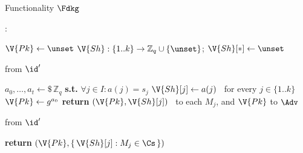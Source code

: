 \begin{interface}[nofloat]{Functionality $\Fdkg$ \\
}

{\scriptsize
\setlength{\columnsep}{1.4em}
\begin{multicols}{2}
:
\begin{algorithmic}[1]
\setcounter{contline}{0}\algcont
\State $\V{Pk} \gets \unset$
\State $\V{Sh} : \{1..k\} \to \mathbb{Z}_q \cup \{\unset\}$; \quad $\V{Sh}[*] \gets \unset$
\algsave
\end{algorithmic}
\vspace{1.4ex}

\columnbreak

 \quad from $\id'$
\begin{algorithmic}[1]
\algcont
{} \label{ln:dkgonce}
 \label{ln:dkgcorrupt}
\State $a_0, \dots, a_t \gets \$\, \mathbb{Z}_q$ \textbf{ s.t. } $\forall j \in I : a(j) = s_j$ \label{ln:dkgpoly}
\State $\V{Sh}[j] \gets a(j)$ \ for every $j \in \{1..k\}$ \label{ln:dkgshares}
\State $\V{Pk} \gets g^{a_0}$ \label{ln:dkgpub}
\State \textbf{return} $(\V{Pk}, \V{Sh}[j])$ \ to each $M_j$, and $\V{Pk}$ to $\Adv$
\algsave
\end{algorithmic}
\vspace{1.4ex}

 \quad from $\id'$
\begin{algorithmic}[1]
\algcont
\State \textbf{return} $(\V{Pk}, \{\, \V{Sh}[j] : M_j \in \Cs \,\})$ \label{ln:dkgleak}
\algsave
\end{algorithmic}
\end{multicols}}
\end{interface}
